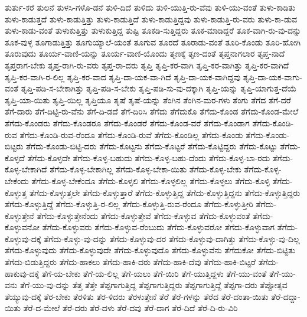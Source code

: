 {ತುರ್ತು-ಕರೆ
ತುಲನೆ
ತುಳಸಿ-ಗಳೊ-ಡನೆ
ತುಳಿ-ದಿದೆ
ತುಳಿದು
ತುಳಿ-ಯುತ್ತಿ-ರು-ವೆವು
ತುಳಿ-ಯು-ವಂತೆ
ತುಳು-ಕಾಡಿತು
ತುಳು-ಕಾಡುತ್ತದೆ
ತುಳು-ಕಾಡುತ್ತಿತ್ತು
ತುಳು-ಕಾಡುತ್ತಿದೆ
ತುಳು-ಕಾಡುತ್ತಿದ್ದವು
ತುಳು-ಕಾಡುತ್ತಿ-ರು-ವರು
ತುಳು-ಕಾ-ಡುವ
ತುಳು-ಕಾಡು-ವಂತೆ
ತುಳುಕುತ್ತಿತ್ತು
ತುಳುಕುತ್ತಿದ್ದ
ತುಷ್ಟಿ
ತೂಕಡಿ-ಸುತ್ತಿದ್ದರು
ತೂಕ-ಮಾಡಿದ್ದರೆ
ತೂಕ-ವಾಗಿ-ರು-ವು-ದನ್ನು
ತೂಕ-ವುಳ್ಳ
ತೂಗಾಡುತ್ತಿತ್ತು
ತೂಗುಯ್ಯಾಲೆ-ಯಂತೆ
ತೂಗುವ
ತೂರದೆ
ತೂರಾಡು-ವಂತೆ
ತೂರಿ-ಕೊಂಡು
ತೂರಿ-ಹೋಗಿ
ತೂರುವುದು
ತೂರ್ಯ-ವಾಣಿ-ಯನ್ನು
ತೂರ್ಯ-ವಾಣಿ-ಯೊಂದು
ತೃಣಕ್ಕೆ
ತೃಣ-ದಂತೆ
ತೃಪ್ತನಾಗಲಾರ
ತೃಪ್ತ-ನಾದೆ
ತೃಪ್ತರಾಗ-ಬೇಕು
ತೃಪ್ತ-ರಾಗಿ-ರು-ವರು
ತೃಪ್ತ-ರಾ-ದರು
ತೃಪ್ತಿ
ತೃಪ್ತಿ-ಕರ-ವಾಗಿ
ತೃಪ್ತಿ-ಕರ-ವಾಗಿತ್ತು
ತೃಪ್ತಿ-ಕರ-ವಾಗಿದೆ
ತೃಪ್ತಿ-ಕರ-ವಾಗಿ-ರ-ಲಿಲ್ಲ
ತೃಪ್ತಿ-ಕರ-ವಾದ
ತೃಪ್ತಿ-ದಾ-ಯಕ-ವಾ-ಗಿದೆ
ತೃಪ್ತಿ-ದಾ-ಯಕ-ವಾಗಿದ್ದವು
ತೃಪ್ತಿ-ದಾ-ಯಕ-ವಾಗು-ವಂತೆ
ತೃಪ್ತಿ-ಪಡಿ-ಸ-ಬೇಕಾಗಿತ್ತು
ತೃಪ್ತಿ-ಪಡಿ-ಸ-ಬೇಕು
ತೃಪ್ತಿ-ಪಡಿ-ಸು-ವು-ದಕ್ಕಾಗಿ
ತೃಪ್ತಿ-ಯನ್ನು
ತೃಪ್ತಿ-ಯಾಗುತ್ತ-ದೆಯೆ
ತೃಪ್ತಿ-ಯಾ-ಯಿತು
ತೃಪ್ತಿ-ಯಿಲ್ಲ
ತೃಪ್ತಿಯೂ
ತೃಷೆ
ತೃಷೆ-ಯನ್ನು
ತೆಂಗಿನ
ತೆಂಗಿನ-ಮರ-ಗಳು
ತೆಂಗು
ತೆಗೆದ
ತೆಗೆ-ದರೆ
ತೆಗೆ-ದಾರು
ತೆಗೆ-ದಿಟ್ಟಿ-ರು-ವೆನು
ತೆಗೆ-ದಿ-ಡದೆ
ತೆಗೆ-ದಿರಿಸಿ
ತೆಗೆದು
ತೆಗೆದುಕೊ
ತೆಗೆದು-ಕೊಂಡ
ತೆಗೆದು-ಕೊಂಡ-ಮೇಲೆ
ತೆಗೆದು-ಕೊಂಡರು
ತೆಗೆದು-ಕೊಂಡರೂ
ತೆಗೆದು-ಕೊಂಡರೆ
ತೆಗೆದು-ಕೊಂಡ-ವರೆ
ತೆಗೆದು-ಕೊಂಡಾಗ
ತೆಗೆದು-ಕೊಂಡಿ-ರುವ
ತೆಗೆದು-ಕೊಂಡಿ-ರುವ-ರೆಂದೂ
ತೆಗೆದು-ಕೊಂಡಿ-ರುವೆ
ತೆಗೆದು-ಕೊಂಡಿಲ್ಲ
ತೆಗೆದು-ಕೊಂಡು
ತೆಗೆದು-ಕೊಂಡು-ಬಿಟ್ಟರು
ತೆಗೆದು-ಕೊಂಡು-ಬಿಟ್ಟಿ-ದರು
ತೆಗೆದು-ಕೊಟ್ಟನು
ತೆಗೆದು-ಕೊಟ್ಟರೆ
ತೆಗೆದು-ಕೊಟ್ಟಿದ್ದರು
ತೆಗೆದು-ಕೊಟ್ಟು
ತೆಗೆದು-ಕೊಳ್ಳದೆ
ತೆಗೆದು-ಕೊಳ್ಳದೇ
ತೆಗೆದು-ಕೊಳ್ಳ-ಬಹುದು
ತೆಗೆದು-ಕೊಳ್ಳ-ಬಹು-ದೆಂದು
ತೆಗೆದು-ಕೊಳ್ಳ-ಬಾ-ರದು
ತೆಗೆದು-ಕೊಳ್ಳ-ಬೇಕಾಗಿದೆ
ತೆಗೆದು-ಕೊಳ್ಳ-ಬೇಕಾಗಿಲ್ಲ
ತೆಗೆದು-ಕೊಳ್ಳ-ಬೇಕಾ-ಯಿತು
ತೆಗೆದು-ಕೊಳ್ಳ-ಬೇಕು
ತೆಗೆದು-ಕೊಳ್ಳ-ಬೇಕೆಂದು
ತೆಗೆದು-ಕೊಳ್ಳ-ಬೇಕೆಂದೂ
ತೆಗೆದು-ಕೊಳ್ಳಲಿ
ತೆಗೆದು-ಕೊಳ್ಳಲಿಲ್ಲ
ತೆಗೆದು-ಕೊಳ್ಳಲು
ತೆಗೆದು-ಕೊಳ್ಳಿ
ತೆಗೆದು-ಕೊಳ್ಳುತ್ತ
ತೆಗೆದು-ಕೊಳ್ಳುತ್ತಲೇ
ತೆಗೆದು-ಕೊಳ್ಳುತ್ತಾರೆ
ತೆಗೆದು-ಕೊಳ್ಳುತ್ತಿದ್ದ
ತೆಗೆದು-ಕೊಳ್ಳುತ್ತಿದ್ದನು
ತೆಗೆದು-ಕೊಳ್ಳುತ್ತಿದ್ದರು
ತೆಗೆದು-ಕೊಳ್ಳುತ್ತಿದ್ದೆ
ತೆಗೆದು-ಕೊಳ್ಳುತ್ತಿ-ರ-ಲಿಲ್ಲ
ತೆಗೆದು-ಕೊಳ್ಳುತ್ತಿ-ರುವ-ರೆಂದೂ
ತೆಗೆದು-ಕೊಳ್ಳುತ್ತೀರಿ
ತೆಗೆದು-ಕೊಳ್ಳುತ್ತೇನೆ
ತೆಗೆದು-ಕೊಳ್ಳುತ್ತೇನೆಂದು
ತೆಗೆದು-ಕೊಳ್ಳುತ್ತೇವೆ
ತೆಗೆದು-ಕೊಳ್ಳುವ
ತೆಗೆದು-ಕೊಳ್ಳುವಂತೆ
ತೆಗೆದು-ಕೊಳ್ಳುವನೋ
ತೆಗೆದು-ಕೊಳ್ಳುವರು
ತೆಗೆದು-ಕೊಳ್ಳುವ-ರೆಂಬುದು
ತೆಗೆದು-ಕೊಳ್ಳುವರೋ
ತೆಗೆದು-ಕೊಳ್ಳುವಾಗ
ತೆಗೆದು-ಕೊಳ್ಳುವು-ದಕ್ಕೆ
ತೆಗೆದು-ಕೊಳ್ಳು-ವು-ದನ್ನು
ತೆಗೆದು-ಕೊಳ್ಳುವು-ದರ
ತೆಗೆದು-ಕೊಳ್ಳುವು-ದಾಗಿತ್ತು
ತೆಗೆದು-ಕೊಳ್ಳು-ವು-ದಿಲ್ಲ
ತೆಗೆದು-ಕೊಳ್ಳುವುದು
ತೆಗೆದು-ಕೊಳ್ಳುವುದೇ
ತೆಗೆದು-ಕೊಳ್ಳುವುದೊ
ತೆಗೆದು-ಕೊಳ್ಳುವೆನು
ತೆಗೆದುಕೋ
ತೆಗೆದು-ಬಿಟ್ಟಿತು
ತೆಗೆದು-ಬಿಡುತ್ತಿದ್ದರು
ತೆಗೆದು-ಹಾಕಲು
ತೆಗೆದು-ಹಾಕಿ-ದರು
ತೆಗೆದು-ಹಾಕಿ-ದೆವು
ತೆಗೆದು-ಹಾಕಿ-ಬಿಟ್ಟರೆ
ತೆಗೆದು-ಹಾಕುವು-ದಕ್ಕೆ
ತೆಗೆ-ಯ-ಬೇಕು
ತೆಗೆ-ಯ-ಲಿಲ್ಲ
ತೆಗೆ-ಯಲು
ತೆಗೆ-ಯಿರಿ
ತೆಗೆ-ಯುತ್ತಿದ್ದಳು
ತೆಗೆ-ಯು-ವಂತೆ
ತೆಗೆ-ಯು-ವನು
ತೆಗೆ-ಯು-ವು-ದನ್ನು
ತೆತ್ತ
ತೆತ್ತೇ
ತೆಪ್ಪಗಾಗುತ್ತಿದ್ದ
ತೆಪ್ಪಗಾಗುತ್ತಿದ್ದರು
ತೆಪ್ಪಗಾಗುತ್ತಿದ್ದೆ
ತೆಪ್ಪಗಾ-ದರು
ತೆಪ್ಪೋತ್ಸವ
ತೆಯ್ಯುವು-ದಕ್ಕೆ
ತೆರ-ಬೇಕು
ತೆರಳಿತು
ತೆರ-ಳಿದರು
ತೆರಳುತ್ತೇನೆ
ತೆರೆ
ತೆರೆ-ಗಳನ್ನು
ತೆರೆದ
ತೆರೆ-ದಂತಾ-ಯಿತು
ತೆರೆ-ದದ್ದಾ-ಯಿತು
ತೆರೆ-ದ-ಮೇಲೆ
ತೆರೆ-ದರು
ತೆರೆ-ದಳು
ತೆರೆ-ದವು
ತೆರೆ-ದಾಗ
ತೆರೆ-ದಿದೆ
ತೆರೆ-ದಿ-ರು-ವಿರಿ
}
